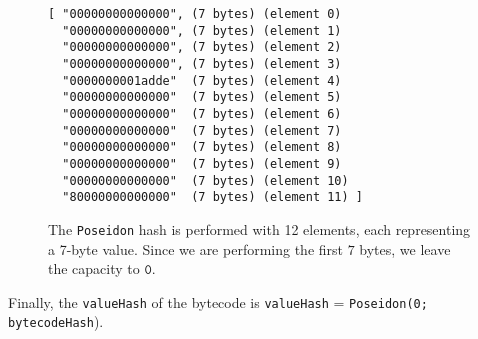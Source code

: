 \begin{itemize}
\begin{figure}[H]
\centering
\begin{lstlisting}[style=verbtt]
[ "00000000000000", (7 bytes) (element 0)
  "00000000000000", (7 bytes) (element 1)
  "00000000000000", (7 bytes) (element 2)
  "00000000000000", (7 bytes) (element 3)
  "0000000001adde"  (7 bytes) (element 4)
  "00000000000000"  (7 bytes) (element 5)
  "00000000000000"  (7 bytes) (element 6)
  "00000000000000"  (7 bytes) (element 7)
  "00000000000000"  (7 bytes) (element 8)
  "00000000000000"  (7 bytes) (element 9)
  "00000000000000"  (7 bytes) (element 10)
  "80000000000000"  (7 bytes) (element 11) ]
\end{lstlisting}
\caption{The \texttt{Poseidon} hash is performed with 12 elements, each representing a 7-byte value. Since we are performing the first $7$ bytes, we leave the capacity to $\texttt{0}$. }
\label{fig:example}
\end{figure}

Finally, the \texttt{valueHash} of the bytecode is  \texttt{valueHash} = \texttt{Poseidon(0;} \texttt{bytecodeHash}).

\end{itemize}